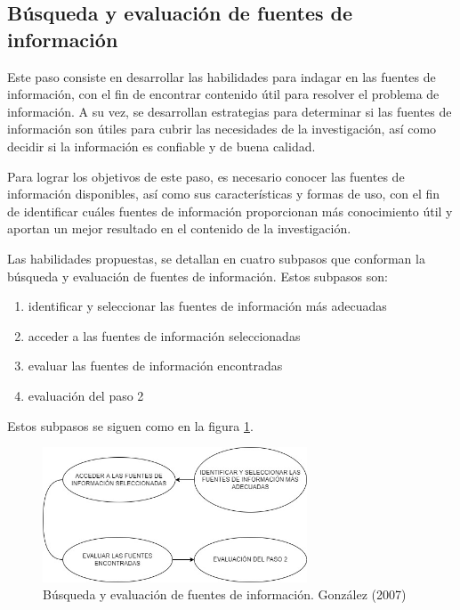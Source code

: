 
\subsection{Búsqueda y evaluación de fuentes de información}
\label{secPaso2Cap2}

Este paso consiste en desarrollar las habilidades para indagar en las fuentes de información, con el fin de encontrar contenido útil para resolver el problema de información. A su vez, se desarrollan estrategias para determinar si las fuentes de información son útiles para cubrir las necesidades de la investigación, así como decidir si la información es confiable y de buena calidad.

Para lograr los objetivos de este paso, es necesario conocer las fuentes de información disponibles, así como sus características y formas de uso, con el fin de identificar cuáles fuentes de información proporcionan más conocimiento útil y aportan un mejor resultado en el contenido de la investigación.

Las habilidades propuestas, se detallan en cuatro subpasos que conforman la búsqueda y evaluación de fuentes de información. Estos subpasos son:

\begin{enumerate}
  \item identificar y seleccionar las fuentes de información más adecuadas
  \item acceder a las fuentes de información seleccionadas
  \item evaluar las fuentes de información encontradas
  \item evaluación del paso 2
\end{enumerate}

Estos subpasos se siguen como en la figura \ref{fig:24}.

\begin{figure}
  \centering
  \includegraphics[width=0.70\textwidth]{Cap2/Figuras/Búsqueda y evaluación de información.jpg}
  \caption{Búsqueda y evaluación de fuentes de información. González (2007)}
  \label{fig:24}
\end{figure}

